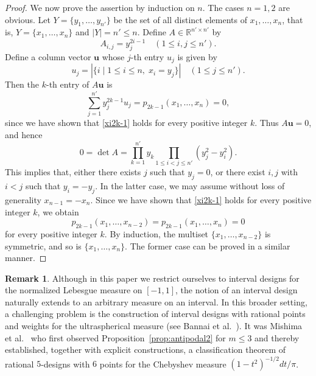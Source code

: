 \documentclass[11pt]{amsart}
\theoremstyle{definition}
\newtheorem{rem}[thm]{Remark}
\newcommand{\R}{\mathbb{R}}
\newcommand{\bu}{\boldsymbol{u}}
\newcommand{\iantipodal}{symmetric}
\begin{document}
\begin{proof}
We now prove the assertion by induction on $n$.
The cases $n=1,2$ are obvious.
Let $Y=\{y_1,\dots,y_{n'}\}$ be the set of all distinct elements of 
$x_1,\dots,x_n$, that is, $Y=\{x_1,\dots,x_n\}$ and
$|Y|=n'\leq n$.
Define $A\in\R^{n'\times n'}$ by
\[
A_{i,j}=y_j^{2i-1}\quad(1\leq i,j\leq n').
\]
Define a column vector $\bu$ whose $j$-th entry $u_j$ is given by
\[
u_j=|\{i\mid 1\leq i\leq n,\;x_i=y_j\}|\quad(1\leq j\leq n').
\]
Then the $k$-th entry of $A\bu$ is
\[
\sum_{j=1}^{n'} y_j^{2k-1}u_j=p_{2k-1}(x_1,\dots,x_n)=0,
\]
since we have shown that \eqref{xi2k-1} holds for every positive integer $k$.
Thus $A\bu=0$, and hence
\[
0=\det A=\prod_{k=1}^{n'}y_{k}\prod_{1\leq i<j\leq n'}(y_j^2-y_i^2).
\]
This implies that, either there exists $j$ such that $y_{j}=0$, or
there exist $i,j$ with $i<j$ such that $y_i=-y_j$.
In the latter case, we may assume without loss of generality $x_{n-1}=-x_n$.
Since we have shown that \eqref{xi2k-1} holds for every positive integer $k$,
we obtain
\[p_{2k-1}(x_1,\dots,x_{n-2})=p_{2k-1}(x_1,\dots,x_{n})=0\]
for every positive integer $k$.
By induction, the multiset $\{x_1,\dots,x_{n-2}\}$ is \iantipodal,
and so is $\{x_1,\dots,x_{n}\}$.
The former case can be proved in a similar manner.
\end{proof}
\begin{rem}
Although in this paper we restrict ourselves to interval designs for the normalized Lebesgue measure on $[-1,1]$, the notion of an interval design naturally extends to an arbitrary measure on an interval. In this broader setting, a challenging problem is the construction of interval designs with rational points and weights for the  ultraspherical measure (see Bannai et al.~\cite[p.~208, Problem~2]{BBIT2019}). It was Mishima et al.~\cite{MLSU2024} who first observed Proposition~\ref{prop:antipodal2} for $m \le 3$ and thereby established, together with explicit constructions, a classification theorem of rational $5$-designs with $6$ points for the Chebyshev measure $(1-t^2)^{-1/2}dt/\pi$.
\end{rem}
\end{document}
